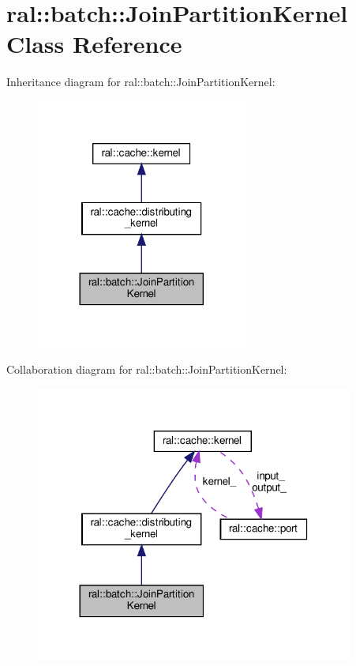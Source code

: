\hypertarget{classral_1_1batch_1_1JoinPartitionKernel}{}\section{ral\+:\+:batch\+:\+:Join\+Partition\+Kernel Class Reference}
\label{classral_1_1batch_1_1JoinPartitionKernel}


Inheritance diagram for ral\+:\+:batch\+:\+:Join\+Partition\+Kernel\+:\nopagebreak
\begin{figure}[H]
\begin{center}
\leavevmode
\includegraphics[width=197pt]{classral_1_1batch_1_1JoinPartitionKernel__inherit__graph}
\end{center}
\end{figure}


Collaboration diagram for ral\+:\+:batch\+:\+:Join\+Partition\+Kernel\+:\nopagebreak
\begin{figure}[H]
\begin{center}
\leavevmode
\includegraphics[width=296pt]{classral_1_1batch_1_1JoinPartitionKernel__coll__graph}
\end{center}
\end{figure}

